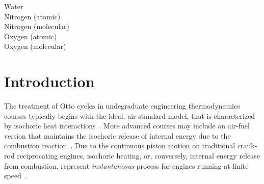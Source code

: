 \begin{tabbing}
                                  \> Water                                                                                                                                    \\
                                    \> Nitrogen (atomic)                                                                                                                        \\
                                   \> Nitrogen (molecular)                                                                                                                     \\
                                    \> Oxygen (atomic)                                                                                                                          \\
                                   \> Oxygen (molecular)                                                                                                                       \\
\end{tabbing}



\section{Introduction}

    The treatment of Otto cycles in undegraduate  engineering  thermodynamics  courses  typically  begins  with  the  ideal,  air-standard  model,  that  is  characterized  by  isochoric  heat
    interactions~\cite{2014-CengelYA+BolesMA-McGrawHill, 2002-MoranMJ+ShapiroHN-LTC, 1985-WylenG-Wiley, 2015-KroosKA+PotterMC-Cengage}. More advanced courses may include  an  air-fuel  version
    that maintains the isochoric release of internal energy due to the combustion  reaction~\cite{2012-BrunettiF-Blucher}.  Due  to  the  continuous  piston  motion  on  traditional  crank-rod
    reciprocating  engines,  isochoric  heating,  or,  conversely,  internal  energy  release  from  combustion,  represent  \emph{instantaneous}  process  for  engines   running   at   finite
    speed~\cite{2017-NaaktgeborenC-IntJMechEngEduc}.

